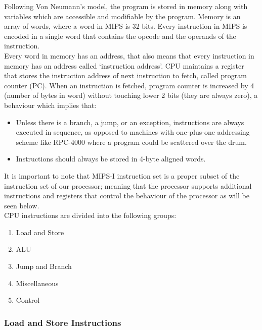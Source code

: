 \documentclass[oneside]{book}
\begin{document}
Following Von Neumann's model, the program is stored in memory along
with variables which are accessible and modifiable by the program.
Memory is an array of words, where a word in MIPS is 32 bits. Every
instruction in MIPS is encoded in a single word that contains
the opcode and the operands of the instruction.\\

Every word in memory has an address, that also means that every
instruction in memory has an address called `instruction address'.
CPU maintains a register that stores the instruction address of
next instruction to fetch, called program counter (PC). When an
instruction is fetched, program counter is increased by 4 (number
of bytes in word) without touching lower 2 bits (they are
always zero), a behaviour which implies that:

\begin{itemize}

\item Unless there is a branch, a jump, or an exception, instructions
      are always executed in sequence, as opposed to machines with
      one-plus-one addressing scheme like RPC-4000 where a program
      could be scattered over the drum.

\item Instructions should always be stored in 4-byte aligned words.

\end{itemize}

It is important to note that MIPS-I instruction set is a proper
subset of the instruction set of our processor; meaning that
the processor supports additional instructions and registers that
control the behaviour of the processor as will be seen below.\\

CPU instructions are divided into the following groups:

\begin{enumerate}

\item Load and Store
\item ALU
\item Jump and Branch
\item Miscellaneous
\item Control

\end{enumerate}

\subsubsection{Load and Store Instructions}
\end{document}
